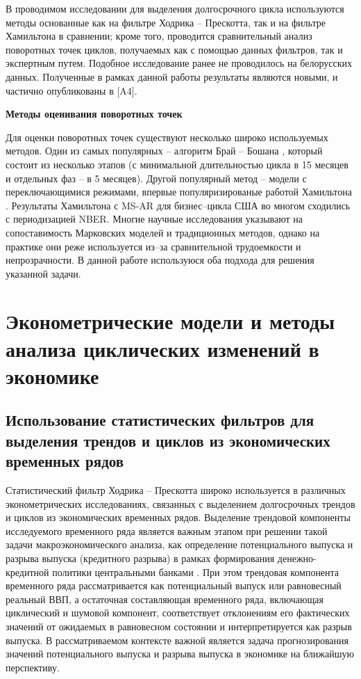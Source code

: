\documentclass[a4paper,14pt]{extreport}
\begin{document}
	В проводимом исследовании для выделения долгосрочного цикла используются методы основанные как на фильтре Ходрика – Прескотта, так и на фильтре Хамильтона в сравнении; кроме того, проводится сравнительный анализ поворотных точек циклов, получаемых как с помощью данных фильтров, так и экспертным путем.
	Подобное исследование ранее не проводилось на белорусских данных. Полученные в рамках данной работы результаты являются новыми, и частично опубликованы в [A4].
	
	\bigskip
	\textbf{Методы оценивания поворотных точек}
	
	Для оценки поворотных точек существуют несколько широко используемых методов. Один из самых популярных -- алгоритм Брай -- Бошана \cite{bryCyclicalAnalysis}, который состоит из несколько этапов (с минимальной длительностью цикла в 15 месяцев и отдельных фаз -- в 5 месяцев). Другой популярный метод -- модели с переключающимися режимами, впервые популяризированые работой Хамильтона \cite{hamNewApproach}. Результаты Хамильтона с MS-AR для бизнес--цикла США во многом сходились с периодизацией NBER. Многие научные исследования \cite{bodmanCanada,brunoItaly,hardingTwoMethods} указывают на сопоставимость Марковских моделей и традиционных методов, однако на практике они реже используется из--за сравнительной трудоемкости и непрозрачности.
	В данной работе используюся оба подхода для решения указанной задачи.
	
	
	\chapter{Эконометрические модели и методы анализа циклических изменений в экономике}
	
	
	\section{Использование статистических фильтров для выделения трендов и циклов из экономических временных рядов}
	
	Статистический фильтр Ходрика -- Прескотта \cite{hp_orig_paper} широко используется в различных эконометрических исследованиях, связанных с выделением долгосрочных трендов и циклов из экономических временных рядов. Выделение трендовой компоненты исследуемого временного ряда является важным этапом при решении такой задачи макроэкономического анализа, как определение потенциального выпуска и разрыва выпуска (кредитного разрыва) в рамках формирования денежно-кредитной политики центральными банками \cite{zubarev_gap, demidenko_gap, schuler_detrend}. При этом трендовая компонента временного ряда рассматривается как потенциальный выпуск или равновесный реальный ВВП, а остаточная составляющая временного ряда, включающая циклический и шумовой компонент,  соответствует отклонениям его фактических значений  от ожидаемых в равновесном состоянии и интерпретируется как разрыв выпуска. В рассматриваемом контексте важной является задача прогнозирования значений потенциального выпуска и разрыва выпуска в экономике на ближайшую перспективу. 
	
\end{document}
